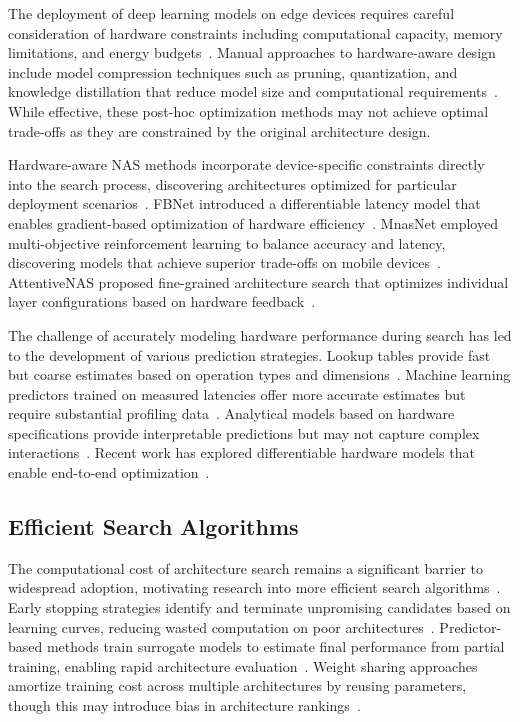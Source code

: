 \documentclass[journal]{IEEEtran}
\begin{document}
The deployment of deep learning models on edge devices requires careful consideration of hardware constraints including computational capacity, memory limitations, and energy budgets~\cite{edge2021survey}. Manual approaches to hardware-aware design include model compression techniques such as pruning, quantization, and knowledge distillation that reduce model size and computational requirements~\cite{compression2022survey}. While effective, these post-hoc optimization methods may not achieve optimal trade-offs as they are constrained by the original architecture design.

Hardware-aware NAS methods incorporate device-specific constraints directly into the search process, discovering architectures optimized for particular deployment scenarios~\cite{hwnas2021}. FBNet introduced a differentiable latency model that enables gradient-based optimization of hardware efficiency~\cite{fbnet2019}. MnasNet employed multi-objective reinforcement learning to balance accuracy and latency, discovering models that achieve superior trade-offs on mobile devices~\cite{mnasnet2019}. AttentiveNAS proposed fine-grained architecture search that optimizes individual layer configurations based on hardware feedback~\cite{attentive2021}.

The challenge of accurately modeling hardware performance during search has led to the development of various prediction strategies. Lookup tables provide fast but coarse estimates based on operation types and dimensions~\cite{lookup2020}. Machine learning predictors trained on measured latencies offer more accurate estimates but require substantial profiling data~\cite{predictor2021}. Analytical models based on hardware specifications provide interpretable predictions but may not capture complex interactions~\cite{analytical2022}. Recent work has explored differentiable hardware models that enable end-to-end optimization~\cite{differentiable2023hw}.

\subsection{Efficient Search Algorithms}

The computational cost of architecture search remains a significant barrier to widespread adoption, motivating research into more efficient search algorithms~\cite{efficient2022nas}. Early stopping strategies identify and terminate unpromising candidates based on learning curves, reducing wasted computation on poor architectures~\cite{earlystop2020}. Predictor-based methods train surrogate models to estimate final performance from partial training, enabling rapid architecture evaluation~\cite{predictor2021nas}. Weight sharing approaches amortize training cost across multiple architectures by reusing parameters, though this may introduce bias in architecture rankings~\cite{weightshare2022}.
\end{document}

